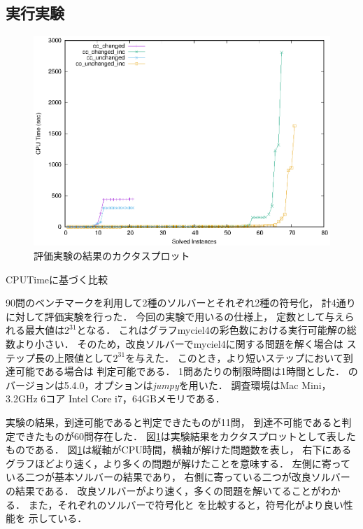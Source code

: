 \subsection{実行実験}
\begin{figure}[t]
  \centering
  \includegraphics[scale=0.9]{fig/cactus.eps}
  \caption{評価実験の結果のカクタスプロット}
  \label{fig:cactus}
\end{figure}

\begin{table}[t]
  \centering
  \tiny
  \caption{CPUTimeに基づく比較}
  \label{tab:result_time}
  
\end{table}

90問のベンチマークを利用して2種のソルバーとそれぞれ2種の符号化，
計4通りに対して評価実験を行った．
今回の実験で用いる{\clingo}の仕様上，
定数として与えられる最大値は$2^31$となる．
これはグラフmyciel4の彩色数における実行可能解の総数より小さい．
そのため，改良ソルバーでmyciel4に関する問題を解く場合は
ステップ長の上限値として$2^31$を与えた．
このとき，より短いステップにおいて到達可能である場合は
判定可能である．
1問あたりの制限時間は1時間とした．
{\clingo}のバージョンは5.4.0，オプションは\textsl{jumpy}を用いた．
調査環境はMac Mini，3.2GHz 6コア Intel Core i7，64GBメモリである．

実験の結果，到達可能であると判定できたものが11問，
到達不可能であると判定できたものが60問存在した．
図\ref{fig:cactus}は実験結果をカクタスプロットとして表したものである．
図\ref{fig:cactus}は縦軸がCPU時間，横軸が解けた問題数を表し，
右下にあるグラフほどより速く，より多くの問題が解けたことを意味する．
左側に寄っている二つが基本ソルバーの結果であり，
右側に寄っている二つが改良ソルバーの結果である．
改良ソルバーがより速く，多くの問題を解いてることがわかる．
また，それぞれのソルバーで符号化と
を比較すると，符号化がより良い性能を
示している．

